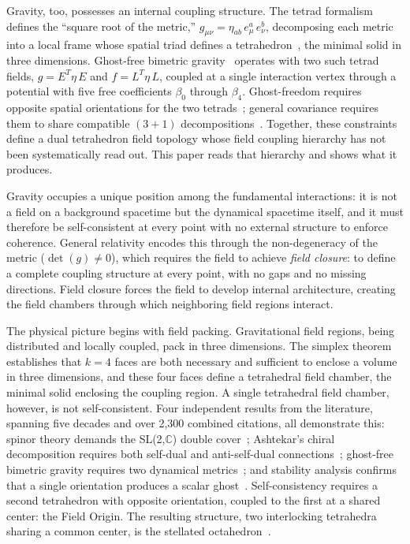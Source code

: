 \documentclass[aps,prd,preprint,superscriptaddress,showpacs,preprintnumbers,amsmath,amssymb,nofootinbib]{revtex4-2}
\begin{document}
Gravity, too, possesses an internal coupling structure. The tetrad formalism~\cite{mtw1973,wald1984} defines the ``square root of the metric,'' $g_{\mu\nu} = \eta_{ab}\,e^a_\mu\,e^b_\nu$, decomposing each metric into a local frame whose spatial triad defines a tetrahedron~\cite{barbieri1998}, the minimal solid in three dimensions. Ghost-free bimetric gravity~\cite{hassan2012,hinterbichler2012} operates with two such tetrad fields, $g = E^T\eta\,E$ and $f = L^T\eta\,L$, coupled at a single interaction vertex through a potential with five free coefficients $\beta_0$ through $\beta_4$. Ghost-freedom requires opposite spatial orientations for the two tetrads~\cite{alexander2014}; general covariance requires them to share compatible $(3{+}1)$ decompositions~\cite{hassankocic2018}. Together, these constraints define a dual tetrahedron field topology whose field coupling hierarchy has not been systematically read out. This paper reads that hierarchy and shows what it produces.

Gravity occupies a unique position among the fundamental interactions: it is not a field on a background spacetime but the dynamical spacetime itself, and it must therefore be self-consistent at every point with no external structure to enforce coherence. General relativity encodes this through the non-degeneracy of the metric ($\det(g) \neq 0$), which requires the field to achieve \emph{field closure}: to define a complete coupling structure at every point, with no gaps and no missing directions. Field closure forces the field to develop internal architecture, creating the field chambers through which neighboring field regions interact.

The physical picture begins with field packing. Gravitational field regions, being distributed and locally coupled, pack in three dimensions. The simplex theorem establishes that $k = 4$ faces are both necessary and sufficient to enclose a volume in three dimensions, and these four faces define a tetrahedral field chamber, the minimal solid enclosing the coupling region. A single tetrahedral field chamber, however, is not self-consistent. Four independent results from the literature, spanning five decades and over 2,300 combined citations, all demonstrate this: spinor theory demands the SL(2,$\mathbb{C}$) double cover~\cite{weinberg1995,geroch1968}; Ashtekar's chiral decomposition requires both self-dual and anti-self-dual connections~\cite{ashtekar1986}; ghost-free bimetric gravity requires two dynamical metrics~\cite{hassan2012}; and stability analysis confirms that a single orientation produces a scalar ghost~\cite{alexander2014}. Self-consistency requires a second tetrahedron with opposite orientation, coupled to the first at a shared center: the Field Origin. The resulting structure, two interlocking tetrahedra sharing a common center, is the stellated octahedron~\cite{coxeter1973}.
\end{document}
